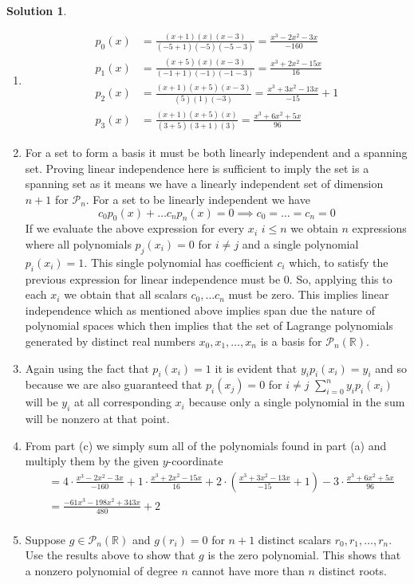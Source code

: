 \documentclass[10pt]{article}
\theoremstyle{definition}
\newtheorem{soln}{Solution}
\begin{document}
\begin{soln}~
  \begin{enumerate}[label=(\alph*)]
    \item \begin{align*}
            p_0(x) & =\frac{(x+1)(x)(x-3)}{(-5+1)(-5)(-5-3)}=\frac{x^3-2x^2-3x}{-160} \\
            p_1(x) & =\frac{(x+5)(x)(x-3)}{(-1+1)(-1)(-1-3)}=\frac{x^3+2x^2-15x}{16}  \\
            p_2(x) & =\frac{(x+1)(x+5)(x-3)}{(5)(1)(-3)}=\frac{x^3+3x^2-13x}{-15}+1   \\
            p_3(x) & =\frac{(x+1)(x+5)(x)}{(3+5)(3+1)(3)}=\frac{x^3+6x^2+5x}{96}
          \end{align*}
    \item For a set to form a basis it must be both linearly independent and a spanning set. Proving linear independence here is sufficient to
          imply the set is a spanning set as it means we have a linearly independent set of dimension $n+1$ for $\mathcal{P}_n$. For a set to be linearly independent
          we have
          $$c_0p_0(x)+\dots c_np_n(x)=0\implies c_0=\dots=c_n=0$$
          If we evaluate the above expression for every $x_i$ $i\leq n$ we obtain $n$ expressions where all polynomials $p_j(x_i)=0$ for $i\neq j$ and a single polynomial
          $p_i(x_i)=1$. This single polynomial has coefficient $c_i$ which, to satisfy the previous expression for linear independence must be 0. So,
          applying this to each $x_i$ we obtain that all scalars $c_0,\dots c_n$ must be zero. This implies linear independence which as mentioned above implies
          span due the nature of polynomial spaces which then implies that the set of Lagrange polynomials generated by distinct real numbers $x_0,x_1,\dots,x_n$ is
          a basis for $\mathcal{P}_n(\mathbb{R})$.
    \item Again using the fact that $p_i(x_i)=1$ it is evident that $y_ip_i(x_i)=y_i$ and so because we
          are also guaranteed that $p_i(x_j)=0$ for $i\neq j$ $\sum_{i=0}^{n}y_ip_i(x_i)$ will be $y_i$ at all corresponding $x_i$ because only a single polynomial
          in the sum will be nonzero at that point.
    \item From part (c) we simply sum all of the polynomials found in part (a) and multiply them by the given $y$-coordinate
          \begin{align*}
             & =4\cdot\frac{x^3-2x^2-3x}{-160}+1\cdot\frac{x^3+2x^2-15x}{16}+2\cdot\left(\frac{x^3+3x^2-13x}{-15}+1\right)-3\cdot\frac{x^3+6x^2+5x}{96} \\
             & =\frac{-61x^3-198x^2+343x}{480}+2                                                                                                        \\
          \end{align*}
    \item Suppose $g\in \mathcal{P}_n(\mathbb{R})$ and $g(r_i) = 0$ for $n + 1$ distinct scalars $r_0,r_1,\dots,r_n$.
          Use the results above to show that $g$ is the zero polynomial. This shows that a nonzero polynomial of degree $n$ cannot have more than $n$ distinct roots.
  \end{enumerate}
\end{soln}
\end{document}
